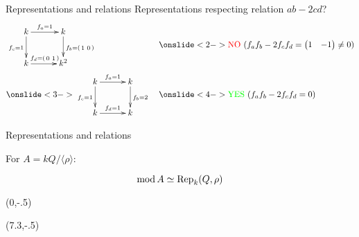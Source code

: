 \begin{frame}{Representations and relations}
Representations respecting relation $ab - 2cd$?
\begin{align*}
&
\vcenter{\xymatrix@C=30pt{
k\ar[r]^{f_a = 1}\ar[d]_{f_c = 1} & k\ar[d]^{f_b
  = \left(\begin{smallmatrix} 1 & 0\end{smallmatrix}\right)}\\
k\ar[r]^{f_d = \left(\begin{smallmatrix} 0 & 1\end{smallmatrix}\right)} & k^2
}}
&&
\onslide<2->{
\text{\textcolor{red}{NO}
($f_a f_b - 2 f_c f_d
  = \begin{pmatrix} 1 & -1 \end{pmatrix} \ne 0$)}}
\\
&
\onslide<3->{
\vcenter{\xymatrix@C=30pt{
k\ar[r]^{f_a = 1}\ar[d]_{f_c = 1} & k\ar[d]^{f_b = 2}\\
k\ar[r]^{f_d = 1} & k
}}}
&&
\onslide<4->{
\text{\textcolor{green}{YES}
($f_a f_b - 2 f_c f_d
  = 0$)}}
\end{align*}
\end{frame}

\begin{frame}{Representations and relations}

For $A = kQ/\langle \rho \rangle$:

{\huge
\[
\operatorname{mod} A \simeq \operatorname{Rep}_k (Q,\rho)
\]
}
\pause
\begin{textblock}{5}(0,-.5)
\end{textblock}
\pause
\begin{textblock}{5}(7.3,-.5)
\end{textblock}
\end{frame}

